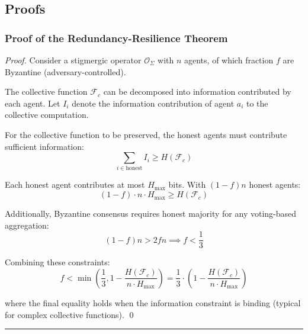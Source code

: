 \documentclass[
]{article}
\begin{document}
\subsection{Proofs}\label{sec:eusocial-proofs}

\subsubsection{Proof of the Redundancy-Resilience
Theorem}\label{sec:proof-redundancy-resilience}

\begin{proof}
Consider a stigmergic operator $\mathcal{O}_\Sigma$ with $n$ agents, of which fraction $f$ are Byzantine (adversary-controlled).

The collective function $\mathcal{F}_c$ can be decomposed into information contributed by each agent. Let $I_i$ denote the information contribution of agent $a_i$ to the collective computation.

For the collective function to be preserved, the honest agents must contribute sufficient information:
\begin{equation}
\sum_{i \in \text{honest}} I_i \geq H(\mathcal{F}_c)
\label{eq:honest-info-sufficiency}
\end{equation}

Each honest agent contributes at most $H_{\max}$ bits. With $(1-f)n$ honest agents:
\begin{equation}
(1-f) \cdot n \cdot H_{\max} \geq H(\mathcal{F}_c)
\label{eq:honest-agent-capacity}
\end{equation}

Additionally, Byzantine consensus requires honest majority for any voting-based aggregation:
\begin{equation}
(1-f)n > 2fn \implies f < \frac{1}{3}
\label{eq:byzantine-honest-majority}
\end{equation}

Combining these constraints:
\begin{equation}
f < \min\left(\frac{1}{3}, 1 - \frac{H(\mathcal{F}_c)}{n \cdot H_{\max}}\right) = \frac{1}{3} \cdot \left(1 - \frac{H(\mathcal{F}_c)}{n \cdot H_{\max}}\right)
\label{eq:byzantine-info-combined}
\end{equation}

where the final equality holds when the information constraint is binding (typical for complex collective functions). \qed
\end{proof}

\begin{center}\rule{0.5\linewidth}{0.5pt}\end{center}
\end{document}
